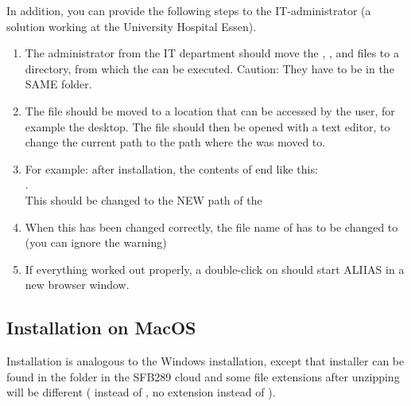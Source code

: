 In addition, you can provide the following steps to the IT-administrator (a solution working at the University Hospital Essen).

\begin{enumerate}
    
    \item The administrator from the IT department should move the , ,  and  files to a directory, from which the  can be executed. Caution: They have to be in the SAME folder. 
    
    \item The  file should be moved to a location that can be accessed by the user, for example the desktop. The file should then be opened with a text editor, to change the current path to the path where the  was moved to.
    \label{item:admin}
    
    \item For example: after installation, the contents of  end like this: \\ . \\ This should be changed to the NEW path of the 
    
    \item When this has been changed correctly, the file name of  has to be changed to  (you can ignore the warning)
    
    \item If everything worked out properly, a double-click on  should start ALIIAS in a new browser window.
\end{enumerate} 

\subsection*{Installation on MacOS}
Installation is analogous to the Windows installation, except that installer can be found in the  folder in the SFB289 cloud and some file extensions after unzipping will be different ( instead of , no extension instead of ).

\vspace{2mm}

\small\setlength\fboxsep{5pt}\setlength\fboxrule{1pt}

\small\setlength\fboxsep{5pt}\setlength\fboxrule{1pt}

